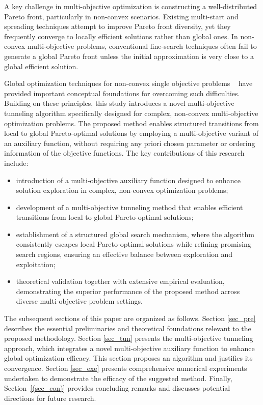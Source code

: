 \documentclass[amsa]{ipart}
\theoremstyle{plain}
\numberwithin{equation}{section}
\begin{document}
A key challenge in multi-objective optimization is constructing a well-distributed Pareto front, particularly in non-convex scenarios. Existing multi-start and spreading techniques \cite{ansary2021sqcqp, fliege2016sqp} attempt to improve Pareto front diversity, yet they frequently converge to locally efficient solutions rather than global ones. In non-convex multi-objective problems, conventional line-search techniques often fail to generate a global Pareto front unless the initial approximation is very close to a global efficient solution.
\par Global optimization techniques for non-convex single objective problems \linebreak
~\cite{chen2024new, ketfi2014global, tunneling1985, duanli2010global, pandiya2021non, renpu1990filled, yang2006new, yilmaz2019new} have provided important conceptual foundations for overcoming such difficulties. Building on these principles, this study introduces a novel multi-objective tunneling algorithm specifically designed for complex, non-convex multi-objective optimization problems. The proposed method enables structured transitions from local to global Pareto-optimal solutions by employing a multi-objective variant of an auxiliary function, without requiring any priori chosen parameter or ordering information of the objective functions. The key contributions of this research include:
\begin{itemize}
    \item introduction of a {multi-objective auxiliary function} designed to enhance solution exploration in complex, non-convex optimization problems;
    \item development of a {multi-objective tunneling method} that enables efficient transitions from local to global Pareto-optimal solutions;
    \item establishment of a structured global search mechanism, where the algorithm consistently escapes local Pareto-optimal solutions while refining promising search regions, ensuring an effective balance between exploration and exploitation;
    \item theoretical validation together with extensive empirical evaluation, demonstrating the superior performance of the proposed method across diverse multi-objective problem settings.
\end{itemize}
\par The subsequent sections of this paper are organized as follows.  Section \ref{sec_pre} describes the essential preliminaries and theoretical foundations relevant to the proposed methodology.  Section \ref{sec_tun} presents the multi-objective tunneling approach, which integrates a novel multi-objective auxiliary function to enhance global optimization efficacy.  This section proposes an algorithm and justifies its convergence.  Section \ref{sec_exe} presents comprehensive numerical experiments undertaken to demonstrate the efficacy of the suggested method. Finally, Section~\ref{(sec_con)} provides concluding remarks and discusses potential directions for future research.
\end{document}
